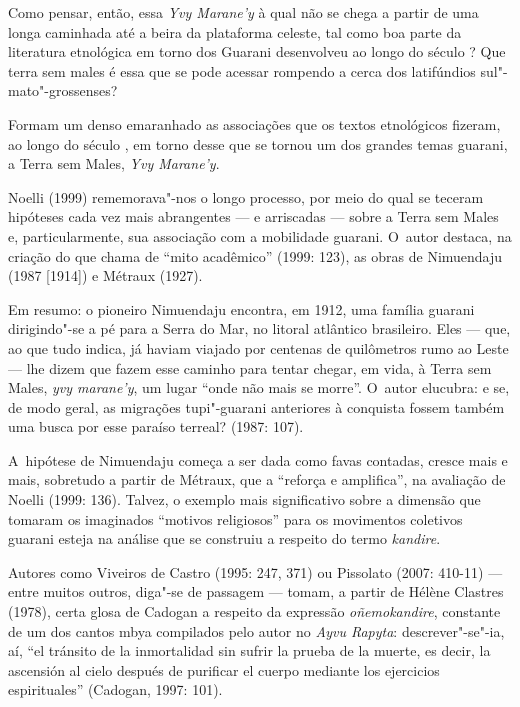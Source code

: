 Como pensar, então, essa \emph{Yvy Marane’y} à qual não se chega a partir de
uma longa caminhada até a beira da plataforma celeste, tal como boa
parte da literatura etnológica em torno dos Guarani desenvolveu ao
longo do século ? Que terra sem males é essa que se pode acessar
rompendo a cerca dos latifúndios sul"-mato"-grossenses?

Formam um denso emaranhado as associações que os textos etnológicos
fizeram, ao longo do século , em torno desse que se tornou um dos
grandes temas guarani, a Terra sem Males, \emph{Yvy Marane’y}.

Noelli (1999) rememorava"-nos o longo processo, por meio do qual se
teceram hipóteses cada vez mais abrangentes --- e arriscadas --- sobre a
Terra sem Males e, particularmente, sua associação com a mobilidade
guarani. O~autor destaca, na criação do que chama de ``mito acadêmico''
(1999: 123), as obras de Nimuendaju (1987 [1914]) e Métraux (1927).

Em resumo: o pioneiro Nimuendaju encontra, em 1912, uma família guarani
dirigindo"-se a pé para a Serra do Mar, no litoral atlântico brasileiro.
Eles --- que, ao que tudo indica, já haviam viajado por centenas de
quilômetros rumo ao Leste --- lhe dizem que fazem esse caminho para
tentar chegar, em vida, à Terra sem Males, \emph{yvy marane’y}, um lugar ``onde
não mais se morre''. O~autor elucubra: e se, de modo geral, as migrações
tupi"-guarani anteriores à conquista fossem também uma busca por esse
paraíso terreal? (1987: 107).

A~hipótese de Nimuendaju começa a ser dada como favas contadas, cresce
mais e mais, sobretudo a partir de Métraux, que a ``reforça e
amplifica'', na avaliação de Noelli (1999: 136). Talvez, o exemplo mais
significativo sobre a dimensão que tomaram os imaginados ``motivos
religiosos'' para os movimentos coletivos guarani esteja na análise que
se construiu a respeito do termo \emph{kandire}.

Autores como Viveiros de Castro (1995: 247, 371) ou Pissolato (2007:
410-11) --- entre muitos outros, diga"-se de passagem --- tomam, a partir de
Hélène Clastres (1978), certa glosa de Cadogan a respeito da expressão
\emph{oñemokandire}, constante de um dos cantos mbya compilados pelo autor no
\emph{Ayvu Rapyta}: descrever"-se"-ia, aí, ``el tránsito de la inmortalidad sin
sufrir la prueba de la muerte, es decir, la ascensión al cielo después
de purificar el cuerpo mediante los ejercicios espirituales'' (Cadogan,
1997: 101). 

